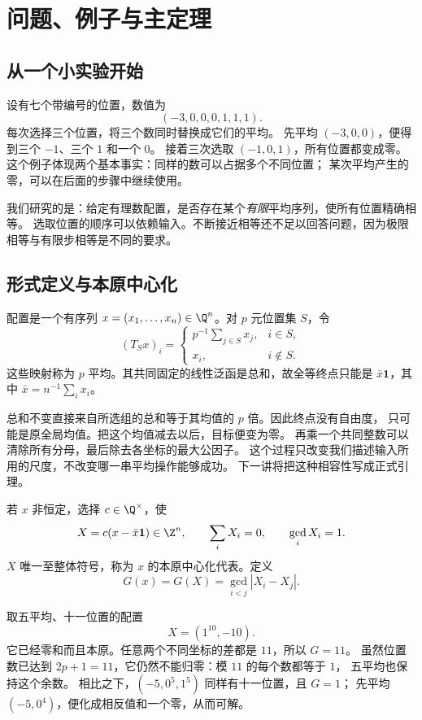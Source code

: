 \chapter{问题、例子与主定理}\label{sec:main}

\section{从一个小实验开始}
设有七个带编号的位置，数值为
\[
(-3,0,0,0,1,1,1).
\]
每次选择三个位置，将三个数同时替换成它们的平均。
先平均 $(-3,0,0)$，便得到三个 $-1$、三个 $1$ 和一个 $0$。
接着三次选取 $(-1,0,1)$，所有位置都变成零。
这个例子体现两个基本事实：同样的数可以占据多个不同位置；
某次平均产生的零，可以在后面的步骤中继续使用。

我们研究的是：给定有理数配置，是否存在某个\emph{有限}平均序列，使所有位置精确相等。
选取位置的顺序可以依赖输入。不断接近相等还不足以回答问题，因为极限相等与有限步相等是不同的要求。

\section{形式定义与本原中心化}

配置是一个有序列 $x=(x_1,\ldots,x_n)\in\Q^n$。对 $p$ 元位置集 $S$，令
\[
(T_Sx)_i=\begin{cases}p^{-1}\sum_{j\in S}x_j,&i\in S,\\x_i,&i\notin S.\end{cases}
\]
这些映射称为 $p$ 平均。其共同固定的线性泛函是总和，故全等终点只能是 $\bar x\mathbf1$，其中 $\bar x=n^{-1}\sum_i x_i$。


总和不变直接来自所选组的总和等于其均值的 $p$ 倍。因此终点没有自由度，
只可能是原全局均值。把这个均值减去以后，目标便变为零。
再乘一个共同整数可以清除所有分母，最后除去各坐标的最大公因子。
这个过程只改变我们描述输入所用的尺度，不改变哪一串平均操作能够成功。
下一讲将把这种相容性写成正式引理。

若 $x$ 非恒定，选择 $c\in\Q^\times$，使
\[
X=c(x-\bar x\mathbf1)\in\Z^n,\qquad \sum_iX_i=0,\qquad \gcd_iX_i=1.
\]
$X$ 唯一至整体符号，称为 $x$ 的本原中心化代表。定义
\begin{equation}\label{eq:G}
G(x)=G(X)=\gcd_{i<j}|X_i-X_j|.
\end{equation}


\begin{example}[如何算判据]
取五平均、十一位置的配置
\[
X=(1^{10},-10).
\]
它已经零和而且本原。任意两个不同坐标的差都是 $11$，所以 $G=11$。
虽然位置数已达到 $2p+1=11$，它仍然不能归零：模 $11$ 的每个数都等于 $1$，
五平均也保持这个余数。
相比之下，$(-5,0^5,1^5)$ 同样有十一位置，且 $G=1$；
先平均 $(-5,0^4)$，便化成相反值和一个零，从而可解。
\end{example}

